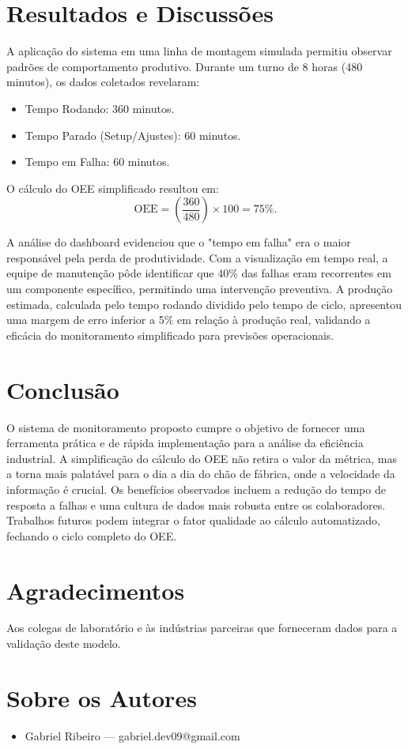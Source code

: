 \documentclass[12pt]{unisenaiclass}
\begin{document}
\section{Resultados e Discussões}
A aplicação do sistema em uma linha de montagem simulada permitiu observar padrões de comportamento produtivo. Durante um turno de 8 horas (480 minutos), os dados coletados revelaram:
\begin{itemize}
    \item Tempo Rodando: 360 minutos.
    \item Tempo Parado (Setup/Ajustes): 60 minutos.
    \item Tempo em Falha: 60 minutos.
\end{itemize}

O cálculo do OEE simplificado resultou em:
\[
    \text{OEE} = \left(\dfrac{360}{480}\right) \times 100 = 75\%.
\]

A análise do dashboard evidenciou que o "tempo em falha" era o maior responsável pela perda de produtividade. Com a visualização em tempo real, a equipe de manutenção pôde identificar que 40\% das falhas eram recorrentes em um componente específico, permitindo uma intervenção preventiva. A produção estimada, calculada pelo tempo rodando dividido pelo tempo de ciclo, apresentou uma margem de erro inferior a 5\% em relação à produção real, validando a eficácia do monitoramento simplificado para previsões operacionais.

\section{Conclusão}
O sistema de monitoramento proposto cumpre o objetivo de fornecer uma ferramenta prática e de rápida implementação para a análise da eficiência industrial. A simplificação do cálculo do OEE não retira o valor da métrica, mas a torna mais palatável para o dia a dia do chão de fábrica, onde a velocidade da informação é crucial. Os benefícios observados incluem a redução do tempo de resposta a falhas e uma cultura de dados mais robusta entre os colaboradores. Trabalhos futuros podem integrar o fator qualidade ao cálculo automatizado, fechando o ciclo completo do OEE.

\section*{Agradecimentos}
Aos colegas de laboratório e às indústrias parceiras que forneceram dados para a validação deste modelo.

\section*{Sobre os Autores}
\begin{itemize}
    \item Gabriel Ribeiro — gabriel.dev09@gmail.com
\end{itemize}

\printbibliography
\end{document}
